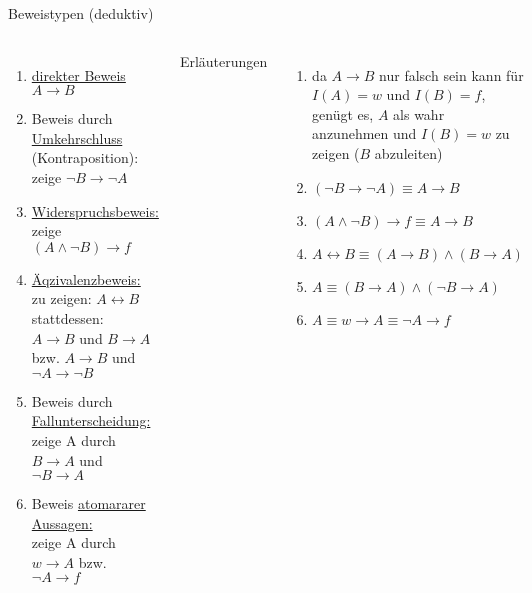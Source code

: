 \begin{frame}[shrink=5]{Beweistypen (deduktiv)}
	\begin{columns}
			\begin{enumerate}
				\item \underline{direkter Beweis} $A \rightarrow B$
				\item Beweis durch \underline{Umkehrschluss} (Kontraposition): zeige $\neg B \rightarrow \neg A$
				\item \underline{Widerspruchsbeweis:} zeige $(A \land \neg B) \rightarrow f$
				\item \underline{Äqzivalenzbeweis:}\\
				zu zeigen: $A \leftrightarrow B$\\
				stattdessen:\\
				$A \rightarrow B$ und $B \rightarrow A$ bzw. $A \rightarrow B$ und $\neg A \rightarrow \neg B$
				\item Beweis durch \underline{Fallunterscheidung:}\\
				zeige A durch $B \rightarrow A$ und $\neg B \rightarrow A$
				\item Beweis \underline{atomararer Aussagen:}\\
				zeige A durch $w \rightarrow A$ bzw. $\neg A \rightarrow f$
			\end{enumerate}
			Erläuterungen
			\begin{enumerate}
				\item da $A \rightarrow B$ nur falsch sein kann für $I(A)=w$ und $I(B)=f$, genügt es, $A$ als wahr anzunehmen und $I(B)=w$ zu zeigen ($B$ abzuleiten)
				\item $(\neg B \rightarrow \neg A) \equiv A \rightarrow B$
				\item $(A \land \neg B) \rightarrow f \equiv A \rightarrow B$
				\item $A \leftrightarrow B \equiv (A \rightarrow B) \land (B \rightarrow A)$
				\item $A \equiv (B \rightarrow A) \land (\neg B \rightarrow A)$
				\item $A \equiv w \rightarrow A \equiv \neg A \rightarrow f$
			\end{enumerate}
	\end{columns}
\end{frame}

